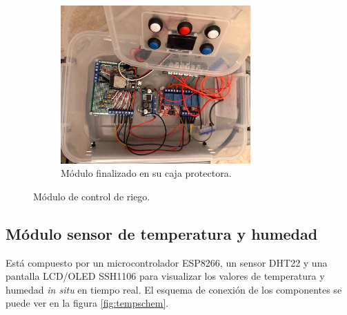 \begin{figure}[!h]
      \begin{subfigure}[b]{0.45\textwidth}
	\centering
		\includegraphics[width=0.8\textwidth]{./Figures/control_riego3.jpg}
		\caption[Conexionado]{Módulo finalizado en su caja protectora.}
		\label{fig:riego3}
     \end{subfigure}	
     \hfill
        \caption[Módulo de control de riego]{Módulo de control de riego.}
        \label{fig:riego_control}
\end{figure}


 
\pagebreak

\subsection{Módulo sensor de temperatura y humedad}
\label{Módulo sensor de temperatura y humedad}

Está compuesto por un microcontrolador ESP8266, un sensor DHT22 y una pantalla LCD/OLED SSH1106 para visualizar los valores de temperatura y humedad  \textit{in situ} en tiempo real. El esquema de conexión de los componentes se puede ver en la figura \ref{fig:tempschem}.

